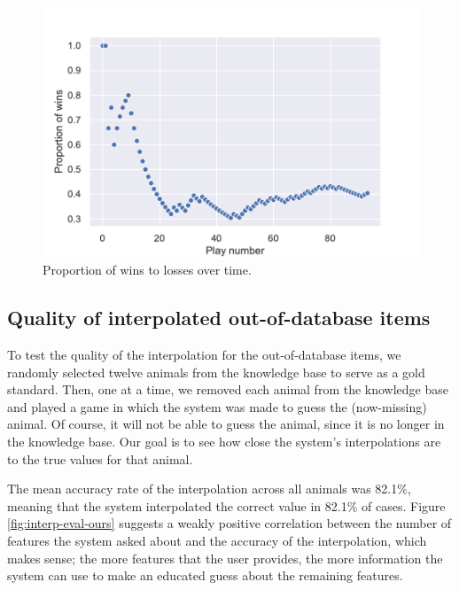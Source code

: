 \documentclass[11pt,a4paper]{article}
\begin{document}
\begin{figure}
    \centering
    \includegraphics[scale = .5]{graphics/stats-eval.pdf}
    \caption{Proportion of wins to losses over time.}
    \label{fig:win-over-time}
\end{figure}

\subsection{Quality of interpolated out-of-database items}

To test the quality of the interpolation for the out-of-database items, we randomly selected twelve animals from the knowledge base to serve as a gold standard.
Then, one at a time, we removed each animal from the knowledge base and played a game in which the system was made to guess the (now-missing) animal. 
Of course, it will not be able to guess the animal, since it is no longer in the knowledge base.
Our goal is to see how close the system's interpolations are to the true values for that animal.


The mean accuracy rate of the interpolation across all animals was 82.1\%, meaning that the system interpolated the correct value in 82.1\% of cases.
Figure \ref{fig:interp-eval-ours} suggests a weakly positive correlation between the number of features the system asked about and the accuracy of the interpolation, which makes sense; the more features that the user provides, the more information the system can use to make an educated guess about the remaining features.
\end{document}
